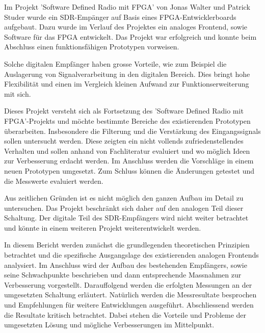 Im Projekt 'Software Defined Radio mit FPGA' von Jonas Walter und Patrick Studer\cite{SDRprev} wurde ein SDR-Empänger auf Basis eines FPGA-Entwicklerboards aufgebaut. Dazu wurde im Verlauf des Projektes ein analoges Frontend, sowie Software für das FPGA entwickelt. Das Projekt war erfolgreich und konnte beim Abschluss einen funktionsfähigen Prototypen vorweisen.

Solche digitalen Empfänger haben grosse Vorteile, wie zum Beispiel die Auslagerung von Signalverarbeitung in den digitalen Bereich. Dies bringt hohe Flexibilität und einen im Vergleich kleinen Aufwand zur Funktionserweiterung mit sich.

Dieses Projekt versteht sich als Fortsetzung des 'Software Defined Radio mit FPGA'-Projekts und möchte bestimmte Bereiche des existierenden Prototypen überarbeiten. Insbesondere die Filterung und die Verstärkung des Eingangssignals sollen untersucht werden. Diese zeigten ein nicht vollends zufriedenstellendes Verhalten und sollen anhand von Fachliteratur evaluiert und wo möglich Ideen zur Verbesserung erdacht werden. Im Anschluss werden die Vorschläge in einem neuen Prototypen umgesetzt. Zum Schluss können die Änderungen getestet und die Messwerte evaluiert werden.

Aus zeitlichen Gründen ist es nicht möglich den ganzen Aufbau im Detail zu untersuchen. Das Projekt beschränkt sich daher auf den analogen Teil dieser Schaltung. Der digitale Teil des SDR-Empfängers wird nicht weiter betrachtet und könnte in einem weiteren Projekt weiterentwickelt werden.

In diesem Bericht werden zunächst die grundlegenden theoretischen Prinzipien betrachtet und die spezifische Ausgangslage des existierenden analogen Frontends analysiert.
Im Anschluss wird der Aufbau des bestehenden Empfängers, sowie seine Schwachpunkte beschrieben und dann entsprechende Massnahmen zur Verbesserung vorgestellt. Darauffolgend werden die erfolgten Messungen an der umgesetzten Schaltung erläutert. Natürlich werden die Messresultate besprochen und Empfehlungen für weitere Entwicklungen ausgeführt. Abschliessend werden die Resultate kritisch betrachtet. Dabei stehen die Vorteile und Probleme der umgesetzten Lösung und mögliche Verbesserungen im Mittelpunkt.
